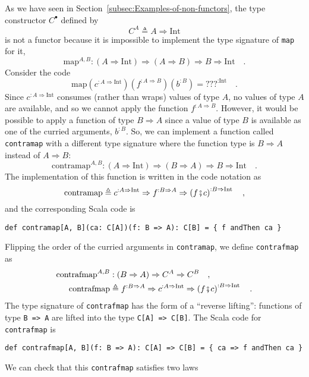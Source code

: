 As we have seen in Section~\ref{subsec:Examples-of-non-functors},
the type constructor $C^{\bullet}$ defined by
\[
C^{A}\triangleq A\Rightarrow\text{Int}
\]
is not a functor because it is impossible to implement the type signature
of \lstinline!map! for it,
\[
\text{map}^{A,B}:\left(A\Rightarrow\text{Int}\right)\Rightarrow\left(A\Rightarrow B\right)\Rightarrow B\Rightarrow\text{Int}\quad.
\]
Consider the code 
\[
\text{map}(c^{:A\Rightarrow\text{Int}})(f^{:A\Rightarrow B})(b^{:B})=\text{???}^{:\text{Int}}\quad.
\]
Since $c^{:A\Rightarrow\text{Int}}$ consumes (rather than wraps)
values of type $A$, no values of type $A$ are available, and so
we cannot apply the function $f^{:A\Rightarrow B}$. However, it would
be possible to apply a function of type $B\Rightarrow A$ since a
value of type $B$ is available as one of the curried arguments, $b^{:B}$.
So, we can implement a function called \lstinline!contramap! with
a different type signature where the function type is $B\Rightarrow A$
instead of $A\Rightarrow B$: 
\[
\text{contramap}^{A,B}:\left(A\Rightarrow\text{Int}\right)\Rightarrow\left(B\Rightarrow A\right)\Rightarrow B\Rightarrow\text{Int}\quad.
\]
The implementation of this function is written in the code notation
as
\[
\text{contramap}\triangleq c^{:A\Rightarrow\text{Int}}\Rightarrow f^{:B\Rightarrow A}\Rightarrow\left(f\bef c\right)^{:B\Rightarrow\text{Int}}\quad,
\]
and the corresponding Scala code is
\begin{lstlisting}
def contramap[A, B](ca: C[A])(f: B => A): C[B] = { f andThen ca }
\end{lstlisting}
Flipping the order of the curried arguments in \lstinline!contramap!,
we define \lstinline!contrafmap! as
\begin{align}
\text{contrafmap}^{A,B} & :\left(B\Rightarrow A\right)\Rightarrow C^{A}\Rightarrow C^{B}\quad,\nonumber \\
\text{contrafmap} & \triangleq f^{:B\Rightarrow A}\Rightarrow c^{:A\Rightarrow\text{Int}}\Rightarrow\left(f\bef c\right)^{:B\Rightarrow\text{Int}}\quad.\label{eq:f-example-1-contrafmap}
\end{align}
The type signature of \lstinline!contrafmap! has the form of a ``reverse
lifting'': functions of type \lstinline!B => A! are lifted into
the type \lstinline!C[A] => C[B]!. The Scala code for \lstinline!contrafmap!
is
\begin{lstlisting}
def contrafmap[A, B](f: B => A): C[A] => C[B] = { ca => f andThen ca } 
\end{lstlisting}
We can check that this \lstinline!contrafmap! satisfies two laws
